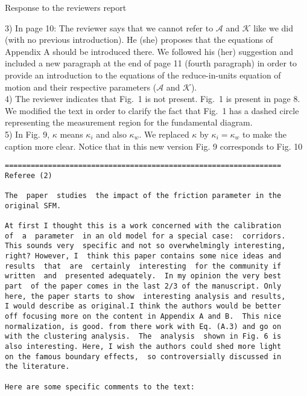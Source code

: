 \documentclass[a4paper,12pt]{letter}
\begin{document}
\begin{letter}{Response to the reviewers report}
{3) In page 10: The reviewer says that we cannot refer to $\mathcal{A}$ and $\mathcal{K}$ like we did (with no previous introduction). He (she) proposes that the equations of Appendix A should be introduced there. We followed his (her) suggestion and included a new paragraph at the end of page 11 (fourth paragraph) in order to provide an introduction to the equations of the reduce-in-units equation of motion and their respective parameters ($\mathcal{A}$ and $\mathcal{K}$).  \\


4) The reviewer indicates that Fig.~1 is not present. Fig.~1 is present in page 8.  \\

We modified the text in order to clarify the fact that Fig.~1 has a 
dashed circle representing the measurement region for the fundamental diagram. \\

5) In Fig. 9, $\kappa$ means $\kappa_i$ and also $\kappa_w$. We replaced $\kappa$ by $\kappa_i = \kappa_w$ to make the caption more clear. Notice that in this new version Fig. 9 corresponds to Fig. 10   


}

\newpage

\begin{verbatim}
================================================================
Referee (2)

The  paper  studies  the impact of the friction parameter in the 
original SFM.

At first I thought this is a work concerned with the calibration 
of  a  parameter  in an old model for a special case:  corridors. 
This sounds very  specific and not so overwhelmingly interesting,
right? However, I  think this paper contains some nice ideas and 
results  that  are  certainly  interesting  for the community if 
written  and  presented adequately.  In my opinion the very best 
part  of the paper comes in the last 2/3 of the manuscript. Only 
here, the paper starts to show  interesting analysis and results,
I would describe as original.I think the authors would be better
off focusing more on the content in Appendix A and B.  This nice 
normalization, is good. from there work with Eq. (A.3) and go on 
with the clustering analysis.  The  analysis  shown in Fig. 6 is 
also interesting. Here, I wish the authors could shed more light
on the famous boundary effects,  so controversially discussed in
the literature.

Here are some specific comments to the text:


\end{verbatim}
\end{letter}
\end{document}
